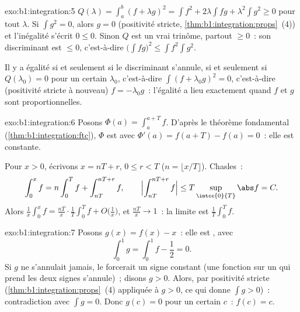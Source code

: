 \begin{solution}{exo:b1:integration:5}
$Q(\lambda) = \int_a^b (f + \lambda g)^2 = \int f^2 + 2\lambda \int
fg + \lambda^2 \int g^2 \geq 0$ pour tout $\lambda$. Si $\int g^2 =
0$, alors $g = 0$ (positivité stricte,
\cref{thm:b1:integration:props}~(4)) et l'inégalité s'écrit $0 \leq
0$. Sinon $Q$ est un vrai trinôme, partout $\geq 0$~: son
discriminant est $\leq 0$, c'est-à-dire $\bigl(\int fg\bigr)^2 \leq
\int f^2 \int g^2$.

Il y a égalité si et seulement si le discriminant s'annule, si et
seulement si $Q(\lambda_0) = 0$ pour un certain $\lambda_0$,
c'est-à-dire $\int (f + \lambda_0 g)^2 = 0$, c'est-à-dire (positivité
stricte à nouveau) $f = -\lambda_0 g$~: l'égalité a lieu exactement
quand $f$ et $g$ sont proportionnelles.
\end{solution}

\begin{solution}{exo:b1:integration:6}
Posons $\Phi(a) = \int_a^{a+T} f$. D'après le théorème fondamental
(\cref{thm:b1:integration:ftc}), $\Phi$ est  avec
$\Phi'(a) = f(a + T) - f(a) = 0$~: elle est constante.

Pour $x > 0$, écrivons $x = nT + r$, $0 \leq r < T$ ($n = \lfloor x/T
\rfloor$). Chasles~:
\[
\int_0^x f = n \int_0^T f + \int_{nT}^{nT + r} f,
\qquad
\Bigl| \int_{nT}^{nT+r} f \Bigr| \leq T \sup_{\intcc{0}{T}} \abs f
= C .
\]
Alors $\frac 1x \int_0^x f = \frac{nT}{x}\cdot\frac 1T \int_0^T f +
O\bigl(\frac 1x\bigr)$, et $\frac{nT}{x} \to 1$~: la limite est
$\frac1T \int_0^T f$.
\end{solution}

\begin{solution}{exo:b1:integration:7}
Posons $g(x) = f(x) - x$~: elle est , avec
\[
\int_0^1 g = \int_0^1 f - \frac12 = 0 .
\]
Si $g$ ne s'annulait jamais, le 
forcerait un signe constant (une fonction  sur un 
qui prend les deux signes s'annule)~; disons $g > 0$. Alors, par
positivité stricte (\cref{thm:b1:integration:props}~(4) appliquée à
$g > 0$, ce qui donne $\int g > 0$)~: contradiction avec $\int g =
0$. Donc $g(c) = 0$ pour un certain $c$~: $f(c) = c$.
\end{solution}

